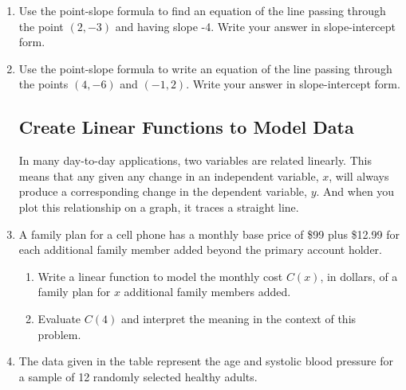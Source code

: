 \vspace{-.1in}
\begin{enumerate}
\item Use the point-slope formula to find an equation of the line passing through the point $(2,-3)$ and having slope -4.  Write your answer in slope-intercept form.\\[1.5in]









\item Use the point-slope formula to write an equation of the line passing through the points $(4,-6)$ and $(-1,2)$.  Write your answer in slope-intercept form.\\[3in]



\newpage


\subsection{Create Linear Functions to Model Data}
\noindent In many day-to-day applications, two variables are related linearly.  This means that any given any change in an independent variable, $x$, will always produce a corresponding change in the dependent variable, $y$.  And when you plot this relationship on a graph, it traces a straight line.\\

\item A family plan for a cell phone has a monthly base price of \$99 plus \$12.99 for each additional family member added beyond the primary account holder.
\begin{enumerate}
\item Write a linear function to model the monthly cost $C(x)$, in dollars, of a family plan for $x$ additional family members added.\\[1in]
\item Evaluate $C(4)$ and interpret the meaning in the context of this problem.\\[1in]
\end{enumerate}




\item The data given in the table represent the age and systolic blood pressure for a sample of 12 randomly selected healthy adults.\\
\begin{table}[h]
\centering


\end{table}
\end{enumerate}
